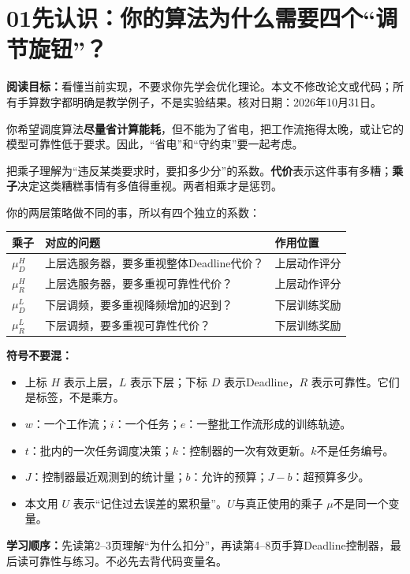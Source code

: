 \documentclass[UTF8,11pt,a4paper,fontset=fandol]{ctexart}
\newcommand{\lesson}[2]{\section*{#1\quad #2}}
\begin{document}
\lesson{01}{先认识：你的算法为什么需要四个“调节旋钮”？}
\textbf{阅读目标：}看懂当前实现，不要求你先学会优化理论。本文不修改论文或代码；所有手算数字都明确是教学例子，不是实验结果。核对日期：2026年10月31日。

你希望调度算法\textbf{尽量省计算能耗}，但不能为了省电，把工作流拖得太晚，或让它的模型可靠性低于要求。因此，“省电”和“守约束”要一起考虑。

\begin{remember}
把乘子理解为“违反某类要求时，要扣多少分”的系数。\textbf{代价}表示这件事有多糟；\textbf{乘子}决定这类糟糕事情有多值得重视。两者相乘才是惩罚。
\end{remember}

你的两层策略做不同的事，所以有四个独立的系数：
\begin{center}
\renewcommand{\arraystretch}{1.45}
\begin{tabularx}{\linewidth}{@{}lXl@{}}
\toprule
乘子 & 对应的问题 & 作用位置\\\midrule
$\mu_D^H$ & 上层选服务器，要多重视整体Deadline代价？ & 上层动作评分\\
$\mu_R^H$ & 上层选服务器，要多重视可靠性代价？ & 上层动作评分\\
$\mu_D^L$ & 下层调频，要多重视降频增加的迟到？ & 下层训练奖励\\
$\mu_R^L$ & 下层调频，要多重视可靠性代价？ & 下层训练奖励\\\bottomrule
\end{tabularx}
\end{center}

\textbf{符号不要混：}
\begin{itemize}
\item 上标 $H$ 表示上层，$L$ 表示下层；下标 $D$ 表示Deadline，$R$ 表示可靠性。它们是标签，不是乘方。
\item $w$：一个工作流；$i$：一个任务；$e$：一整批工作流形成的训练轨迹。
\item $t$：批内的一次任务调度决策；$k$：控制器的一次有效更新。$k$不是任务编号。
\item $J$：控制器最近观测到的统计量；$b$：允许的预算；$J-b$：超预算多少。
\item 本文用 $U$ 表示“记住过去误差的累积量”。$U$与真正使用的乘子 $\mu$不是同一个变量。
\end{itemize}

\textbf{学习顺序：}先读第2--3页理解“为什么扣分”，再读第4--8页手算Deadline控制器，最后读可靠性与练习。不必先去背代码变量名。
\end{document}
